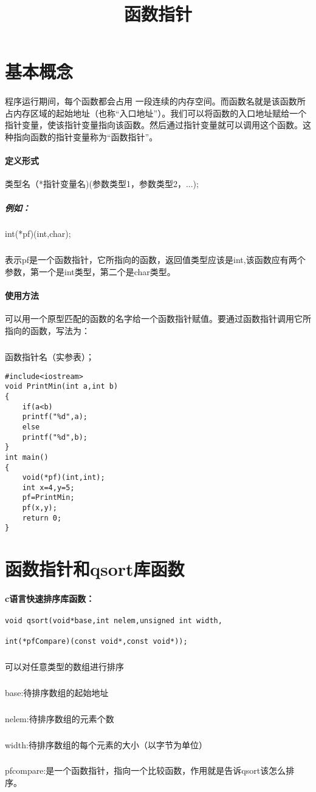 \documentclass{article}
\begin{document}
\begin{CJK}{UTF8}{gbsn}
\title{函数指针}
\date{}
\maketitle
\section{基本概念}
\paragraph{}
程序运行期间，每个函数都会占用 一段连续的内存空间。而函数名就是该函数所占内存区域的起始地址（也称“入口地址”）。我们可以将函数的入口地址赋给一个指针变量，使该指针变量指向该函数。然后通过指针变量就可以调用这个函数。这种指向函数的指针变量称为“函数指针”。
\paragraph{定义形式}
类型名（*指针变量名)(参数类型1，参数类型2，...);
\subparagraph{例如：}
int(*pf)(int,char);
\subparagraph{}
表示pf是一个函数指针，它所指向的函数，返回值类型应该是int,该函数应有两个参数，第一个是int类型，第二个是char类型。
\paragraph{使用方法}
可以用一个原型匹配的函数的名字给一个函数指针赋值。要通过函数指针调用它所指向的函数，写法为：
\subparagraph{}
函数指针名（实参表）； 
\begin{verbatim}
#include<iostream>
void PrintMin(int a,int b)
{
	if(a<b)
	printf("%d",a);
	else
	printf("%d",b);
}
int main()
{
	void(*pf)(int,int);
	int x=4,y=5;
	pf=PrintMin;
	pf(x,y);
	return 0;
}
\end{verbatim}
\section{函数指针和qsort库函数}
\paragraph{c语言快速排序库函数：}
\begin{verbatim}
void qsort(void*base,int nelem,unsigned int width,

int(*pfCompare)(const void*,const void*));
\end{verbatim}
\subparagraph{}
可以对任意类型的数组进行排序
\subparagraph{}
base:待排序数组的起始地址
\subparagraph{}
nelem:待排序数组的元素个数
\subparagraph{}
width:待排序数组的每个元素的大小（以字节为单位）
\subparagraph{}
pfcompare:是一个函数指针，指向一个比较函数，作用就是告诉qsort该怎么排序。

\end{CJK}
\end{document}
